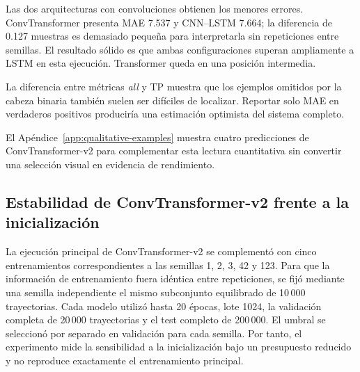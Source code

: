 \documentclass[a4paper,12pt]{article}
\begin{document}
Las dos arquitecturas con convoluciones obtienen los menores errores. ConvTransformer presenta MAE 7.537 y CNN--LSTM 7.664; la diferencia de 0.127 muestras es demasiado pequeña para interpretarla sin repeticiones entre semillas. El resultado sólido es que ambas configuraciones superan ampliamente a LSTM en esta ejecución. Transformer queda en una posición intermedia.

La diferencia entre métricas \emph{all} y TP muestra que los ejemplos omitidos por la cabeza binaria también suelen ser difíciles de localizar. Reportar solo MAE en verdaderos positivos produciría una estimación optimista del sistema completo.

El Apéndice~\ref{app:qualitative-examples} muestra cuatro predicciones de ConvTransformer-v2 para complementar esta lectura cuantitativa sin convertir una selección visual en evidencia de rendimiento.

\subsection{Estabilidad de ConvTransformer-v2 frente a la inicialización}
\label{sec:convtransformer-multiseed}

La ejecución principal de ConvTransformer-v2 se complementó con cinco entrenamientos correspondientes a las semillas 1, 2, 3, 42 y 123. Para que la información de entrenamiento fuera idéntica entre repeticiones, se fijó mediante una semilla independiente el mismo subconjunto equilibrado de 10\,000 trayectorias. Cada modelo utilizó hasta 20 épocas, lote 1024, la validación completa de 20\,000 trayectorias y el test completo de 200\,000. El umbral se seleccionó por separado en validación para cada semilla. Por tanto, el experimento mide la sensibilidad a la inicialización bajo un presupuesto reducido y no reproduce exactamente el entrenamiento principal.
\end{document}
